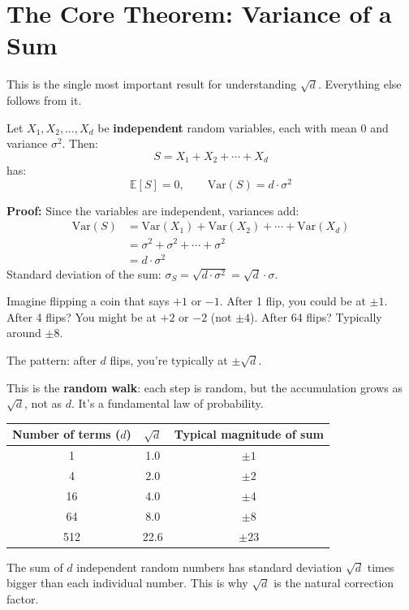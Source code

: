 \documentclass[11pt, a4paper]{article}
\begin{document}
\section{The Core Theorem: Variance of a Sum}

This is the single most important result for understanding $\sqrt{d}$. Everything else follows from it.

\begin{formaldef}
Let $X_1, X_2, \ldots, X_d$ be \textbf{independent} random variables, each with mean $0$ and variance $\sigma^2$. Then:
\[
S = X_1 + X_2 + \cdots + X_d
\]
has:
\[
\mathbb{E}[S] = 0, \qquad \text{Var}(S) = d \cdot \sigma^2
\]

\medskip
\noindent \textbf{Proof:} Since the variables are independent, variances add:
\begin{align*}
\text{Var}(S) &= \text{Var}(X_1) + \text{Var}(X_2) + \cdots + \text{Var}(X_d) \\
              &= \sigma^2 + \sigma^2 + \cdots + \sigma^2 \\
              &= d \cdot \sigma^2
\end{align*}
\noindent Standard deviation of the sum: $\sigma_S = \sqrt{d \cdot \sigma^2} = \sqrt{d} \cdot \sigma$.
\end{formaldef}

\begin{intuition}
Imagine flipping a coin that says $+1$ or $-1$. After 1 flip, you could be at $\pm 1$.
After 4 flips? You might be at $+2$ or $-2$ (not $\pm 4$). After 64 flips? Typically around $\pm 8$.

The pattern: after $d$ flips, you're typically at $\pm \sqrt{d}$.

This is the \textbf{random walk}: each step is random, but the accumulation grows as $\sqrt{d}$,
not as $d$. It's a fundamental law of probability.

\medskip
\begin{center}
\begin{tabular}{ccc}
\toprule
\textbf{Number of terms ($d$)} & $\sqrt{d}$ & \textbf{Typical magnitude of sum} \\
\midrule
1   & 1.0 & $\pm 1$ \\
4   & 2.0 & $\pm 2$ \\
16  & 4.0 & $\pm 4$ \\
64  & 8.0 & $\pm 8$ \\
512 & 22.6 & $\pm 23$ \\
\bottomrule
\end{tabular}
\end{center}

\noindent The sum of $d$ independent random numbers has standard deviation $\sqrt{d}$ times bigger
than each individual number. This is why $\sqrt{d}$ is the natural correction factor.
\end{intuition}
\end{document}
